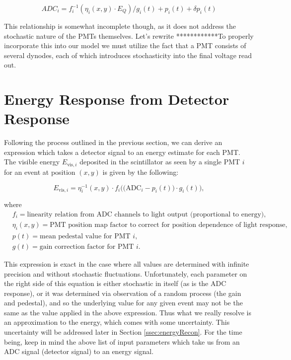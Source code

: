 \begin{equation} \label{eq:pmtResponse}
ADC_i = f_i^{-1}\left(\eta_i(x,y) \cdot E_{Q} \right)/g_i(t) + p_i(t) + \delta p_i(t) 
\end{equation}

This relationship is somewhat incomplete though, as it does not address the
stochastic nature of the PMTs themselves. Let's rewrite ************To properly incorporate this into our
model we must utilize the fact that a PMT consists of several dynodes, each of which
introduces stochasticity into the final voltage read out. 




\section{Energy Response from Detector Response} \label{sec:EnergyResponse}
Following the process outlined in the previous section, we can derive an
expression which takes a detector signal to an energy estimate for each PMT.
The visible energy $E_{\mathrm{vis},i}$ deposited
in the scintillator as seen by a single PMT $i$ for an event at position $(x,y)$ 
is given by the following: 

\begin{equation} \label{eq:EvisResponse}
E_{\mathrm{vis},i} = \eta_i^{-1}(x,y) \cdot f_i\bigg( \Big( \mathrm{ADC}_i - p_i(t) \Big) \cdot g_i(t) \bigg)  ,
\end{equation}

\noindent where 
\begin{align*}
  &f_i = \text{linearity relation from ADC channels to light output (proportional to energy),}\\
  &\eta_i(x,y) = \text{PMT position map factor to correct for position dependence of light response,} \\
  &p(t) = \text{mean pedestal value for PMT } i,\\
  &g(t) = \text{gain correction factor for PMT }i.
\end{align*}

This expression is exact in the case where all values are determined with infinite
precision and without stochastic fluctuations. Unfortunately, each parameter on the right
side of this equation is either stochastic in itself (as is the ADC response), or it was
determined via observation of a random process (the gain and pedestal), and so
the underlying value for any given event may not be the same as the value applied in the
above expression. Thus what we
really resolve is an approximation to the energy, which comes with some uncertainty. This
uncertainty will be addressed later in Section \ref{ssec:energyRecon}.
For the time being, keep in mind the above list of
input parameters which take us from an ADC signal (detector signal) to an energy signal. 

